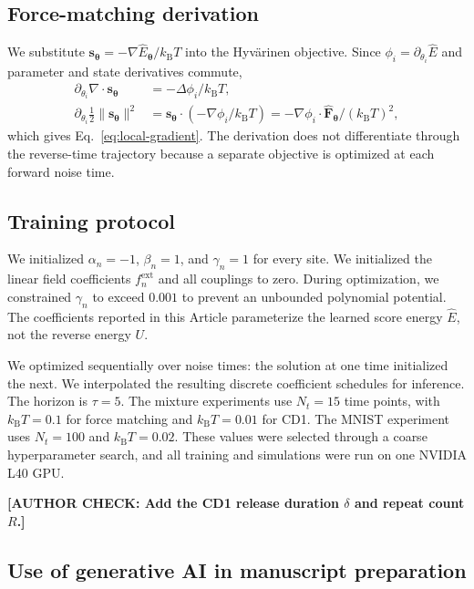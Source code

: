 \documentclass[referee,lineno,pdflatex,sn-nature]{sn-jnl}
\newcommand{\kBT}{k_{\mathrm B}T}
\newcommand{\vect}[1]{\boldsymbol{#1}}
\newcommand{\Ehat}{\widehat E}
\newcommand{\Fhat}{\widehat{\vect F}}
\newcommand{\authorcheck}[1]{\textbf{[AUTHOR CHECK: #1]}}
\begin{document}
\subsection{Force-matching derivation}

We substitute $\vect s_{\vect\theta}=-\nabla\Ehat_{\vect\theta}/\kBT$ into the
Hyv\"arinen objective. Since $\phi_i=\partial_{\theta_i}\Ehat$ and parameter and
state derivatives commute,
\begin{align}
 \partial_{\theta_i}\nabla\!\cdot\vect s_{\vect\theta}
 &=-\Delta\phi_i/\kBT,\\
 \partial_{\theta_i}\tfrac12\lVert\vect s_{\vect\theta}\rVert^2
 &=\vect s_{\vect\theta}\cdot(-\nabla\phi_i/\kBT)
 =-\nabla\phi_i\cdot\Fhat_{\vect\theta}/(\kBT)^2,
\end{align}
which gives Eq.~\eqref{eq:local-gradient}. The derivation does not differentiate
through the reverse-time trajectory because a separate objective is optimized at
each forward noise time.


\subsection{Training protocol}

We initialized $\alpha_n=-1$, $\beta_n=1$, and $\gamma_n=1$ for every site. We
initialized the linear field coefficients $f_n^{\mathrm{ext}}$ and all couplings to
zero.
During optimization, we constrained $\gamma_n$ to exceed $0.001$ to prevent an
unbounded polynomial potential. The coefficients reported in this Article
parameterize the learned score energy $\Ehat$, not the reverse energy $U$.

We optimized sequentially over noise times: the solution at one time initialized
the next. We interpolated the resulting discrete coefficient schedules for
inference. The horizon is $\tau=5$. The mixture experiments use
$N_t=15$ time points, with $\kBT=0.1$ for force matching and $\kBT=0.01$ for
CD1. The MNIST experiment uses $N_t=100$ and $\kBT=0.02$. These values were
selected through a coarse hyperparameter search, and all training and simulations
were run on one NVIDIA L40 GPU.

\authorcheck{Add the CD1 release duration $\delta$ and repeat count $R$.}


\subsection{Use of generative AI in manuscript preparation}
\end{document}
